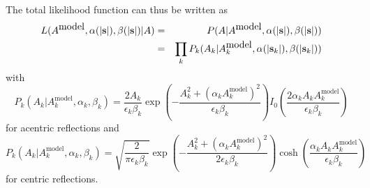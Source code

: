 \documentclass[12pt]{article}
\newcommand{\vect}[1]{{\bf #1}}
\newcommand{\vs}{\vect{s}}
\begin{document}
\begin{sloppy}
The total likelihood function can thus be written as
\begin{eqnarray}
L(A^{\mbox{model}}, \alpha(|\vs|), \beta(|\vs|) | A) 
 &=&   P(A | A^{\mbox{model}}, \alpha(|\vs|), \beta(|\vs|)) \nonumber \\
 &=&  \prod_{k} P_k(A_k | A_k^{\mbox{model}}, \alpha(|\vs_k|), \beta(|\vs_k|))
\end{eqnarray}
with
\begin{equation}
P_k(A_k | A_k^{\mbox{model}}, \alpha_k, \beta_k) =
  \frac{2 A_k}{\epsilon_k\beta_k}
  \exp\left(-\frac{A_k^2+\left(\alpha_k A_k^{\mbox{model}}\right)^2}
                  {\epsilon_k \beta_k}\right)
  I_0\left(\frac{2 \alpha_k A_k A_k^{\mbox{model}}}{\epsilon_k \beta_k}\right)
\end{equation}
for acentric reflections and
\begin{equation}
P_k(A_k | A_k^{\mbox{model}}, \alpha_k, \beta_k) =
  \sqrt{\frac{2}{\pi\epsilon_k\beta_k}}
  \exp\left(-\frac{A_k^2+\left(\alpha_k A_k^{\mbox{model}}\right)^2}
                  {2\epsilon_k \beta_k}\right)
  \cosh\left(\frac{\alpha_k A_k A_k^{\mbox{model}}}{\epsilon_k \beta_k}\right)
\end{equation}
for centric reflections.


\end{sloppy}
\end{document}
